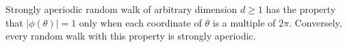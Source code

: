 Strongly aperiodic random walk of arbitrary dimension $d \geq 1$ has the property that $|\phi(\theta)| = 1$ only when each coordinate of $\theta$ is a multiple of $2\pi$. Conversely, every random walk with this property is strongly aperiodic.